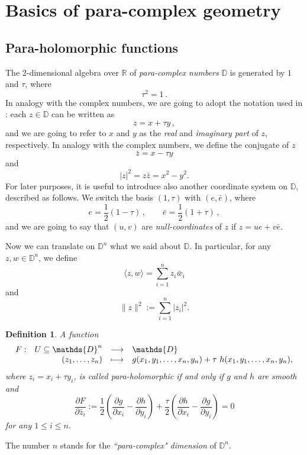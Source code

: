 \documentclass{article}
\newtheorem{df}[thm]{Definition}
\newcommand{\R}{\mathds{R}}
\newcommand{\de}{\partial}
\newcommand{\D}{\mathds{D}}
\begin{document}
\section{Basics of para-complex geometry}\label{basics}
\subsection{Para-holomorphic  functions}

The 2-dimensional algebra over $\R$ of \emph{para-complex numbers} $\D$ is generated by $1$ and $\tau$, where 
$$\tau^2=1\,.
$$
In  analogy with the complex numbers, we are going to adopt the notation used in \cite{hl}: each $z\in\D$ can be written as 
$$
z=x+\tau y\,,
$$
and we are going to refer to $x$ and $y$ as the \emph{real} and \emph{imaginary part} of $z$, respectively.
In analogy with the complex numbers, we define the conjugate of $z$
$$ \bar z=x-\tau y$$
and 
$$|z|^2=z\bar z=x^2-y^2.$$
For later purposes, it is useful to introduce also another coordinate system on $\D$, described as follows. We switch the basis $(1,\tau)$ with $(e,\bar e)$, where
$$
e=\frac{1}{2}\left(1-\tau\right)\,,\qquad \bar e=\frac{1}{2}\left(1+\tau\right)\,,
$$
and we are going to say that $(u,v)$ are \emph{null-coordinates} of $z$ if  $z=ue+v\bar e$. 


Now we can translate on $\D^n$  what we said about $\D$. In particular, for any $z,w\in\D^n$, we define 
$$\langle z, w\rangle= \sum_{i=1}^n z_i\bar w_i$$
and
$$\|z\|^2:=\sum_{i=1}^n |z_i|^2.$$



%
\begin{df}
A  function
$$
\begin{array}{rrcl}
F:&U\subseteq \D^n&\longrightarrow&\D\\
& (z_1,\mathellipsis,z_n)&\longmapsto& g(x_1,y_1,\mathellipsis,x_n,y_n)+ \tau\ h(x_1,y_1,\mathellipsis,x_n,y_n),
\end{array}$$ 
where $z_i=x_i+\tau y_i$, is called \emph{para-holomorphic} if and only if $g$ and $h$ are smooth and
\begin{equation}\label{dezbar}
\frac{\de F}{\de\bar z_i}:=\frac{1}{2}\left( \frac{\de g}{\de x_i}-\frac{\de h}{\de y_i}\right)+\frac{\tau}{2}\left( \frac{\de h}{\de x_i}-\frac{\de g}{\de y_i}\right)=0\end{equation}
for any $1\leq i\leq n$.
\end{df}
The number $n$ stands for the \emph{``para-complex" dimension} of $\D^n$.
\end{document}
